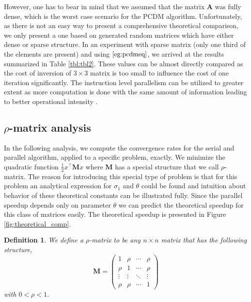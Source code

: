 \documentclass[11pt]{article}
\newtheorem{definition}{Definition}
\newcommand{\bA}{\mathbf{A}}
\begin{document}
	However, one has to bear in mind that we assumed that the matrix $\bA$ was fully dense, which is the worst case scenario for the PCDM algorithm. Unfortunately, as there is not an easy way to present a comprehensive theoretical comparison, we only present a one based on generated random matrices which have either dense or sparse structure. In an experiment with sparse matrix (only one third of the elements are present) and using $\eqref{eg:pcdmeq}$, we arrived at the results summarized in Table \ref{tbl:tbl2}. These values can be almost directly compared as the cost of inversion of $3 \times 3$ matrix is too small to influence the cost of one iteration significantly. The instruction level parallelism can be utilized to greater extent as more computation is done with the same amount of information leading to better operational intensity \cite{Williams2009}.
	
	\subsection{$\rho$-matrix analysis}
	In the following analysis, we compute the convergence rates for the serial and parallel algorithm, applied to a specific problem, exactly. We minimize the quadratic function $\frac{1}{2}x^\top \mathbf{M} x $ where $\mathbf{M}$ has a special structure that we call $\rho$-matrix. The reason for introducing this special type of problem is that for this problem an analytical expression for $\sigma_1$ and $ \theta$ could be found and intuition about behavior of these theoretical constants can be illustrated fully. Since the parallel speedup depends only on parameter $ \theta$ we can predict the theoretical speedup for this class of matrices easily. The theoretical speedup is presented in Figure \ref{fig:theoretical_comp}.
	 
	\begin{definition}
		We define a $\rho$-matrix to be any $n \times n $ matrix that has the following structure,
		$$\mathbf{M} =
		\begin{pmatrix}
		1 & \rho & \cdots & \rho \\
		\rho & 1 & \cdots & \rho \\
		\vdots  & \vdots  & \ddots & \vdots  \\
		\rho & \rho & \cdots & 1
		\end{pmatrix}$$
		with $0<\rho<1$.
	\end{definition}
	
\end{document}

